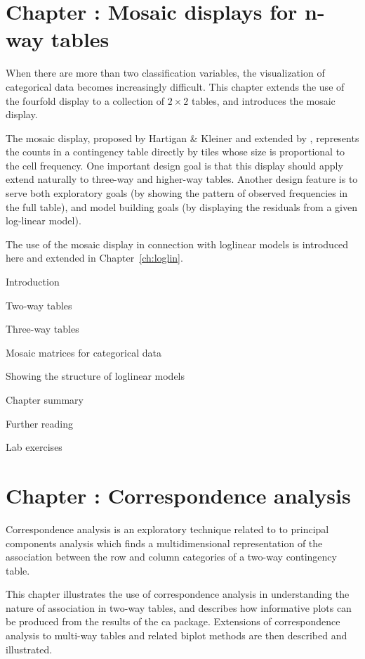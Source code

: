 \documentclass{article}
\newcommand{\Chapter}[1]{\section{Chapter \thesection: #1}}
\newcommand{\Section}[1]{\item #1}
\newcommand{\chref}[1]{Chapter~\ref{#1}}
\newcommand{\loglin}{loglinear}
\newcommand{\pkg}[1]{{\normalfont\fontseries{b}\selectfont #1}}
\begin{document}
\Chapter{Mosaic displays for n-way tables}\label{ch:mosaic}

When there are more than two classification variables,
the visualization of categorical data becomes increasingly
difficult.
This chapter extends the use of the fourfold display to a collection
of $2 \times 2$ tables, and introduces the mosaic display.

The mosaic display, proposed by Hartigan \& Kleiner \citeyear{HartiganKleiner:81}
and extended by \citet{Friendly:94a,Friendly:99b},
represents the counts in a contingency table directly by tiles whose
size is proportional to the cell frequency. One important design goal is that this display
should apply extend naturally to three-way and higher-way
tables.  Another design feature is to serve both exploratory
goals (by showing the pattern of observed frequencies in the
full table),
and model building goals (by displaying the residuals
from a given log-linear model).

The use of the mosaic display in connection with loglinear models
is introduced here and extended in \chref{ch:loglin}.
\begin{enumerate*}
  \Section{Introduction}\label{sec:mosaic-intro}
  \Section{Two-way tables}\label{sec:mosaic-twoway}
  \Section{Three-way tables}\label{sec:mosaic-threeway}
  \Section{Mosaic matrices for categorical data}\label{sec:mosmat}
  \Section{Showing the structure of \loglin{} models}\label{sec:mosaic-struc}
  \Section{Chapter summary}
  \Section{Further reading}
  \Section{Lab exercises}
\end{enumerate*}

\Chapter{Correspondence analysis}\label{ch:corresp}

Correspondence analysis is an exploratory technique related to to
principal components analysis which finds a multidimensional
representation of the association between the row and column
categories of a two-way contingency table.

This chapter illustrates the use of correspondence analysis in
understanding the nature of association in two-way tables,
and describes how informative plots can be produced from the
results of the \pkg{ca} package.
Extensions of correspondence analysis to multi-way tables
and related biplot methods
are then described and illustrated.
\end{document}
